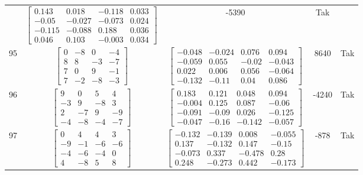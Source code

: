 \documentclass[a4paper,12pt]{article}
\begin{document}
\begin{tabular}{c c c c c}
&
$\begin{bmatrix} 0.143 & 0.018 & -0.118 & 0.033 \\ -0.05 & -0.027 & -0.073 & 0.024 \\ -0.115 & -0.088 & 0.188 & 0.036 \\ 0.046 & 0.103 & -0.003 & 0.034 \end{bmatrix}$
&
-5390
&
Tak
\\
95
&
$\begin{bmatrix} 0 & -8 & 0 & -4 \\ 8 & 8 & -3 & -7 \\ 7 & 0 & 9 & -1 \\ 7 & -2 & -8 & -3 \end{bmatrix}$
&
$\begin{bmatrix} -0.048 & -0.024 & 0.076 & 0.094 \\ -0.059 & 0.055 & -0.02 & -0.043 \\ 0.022 & 0.006 & 0.056 & -0.064 \\ -0.132 & -0.11 & 0.04 & 0.086 \end{bmatrix}$
&
8640
&
Tak
\\
96
&
$\begin{bmatrix} 9 & 0 & 5 & 4 \\ -3 & 9 & -8 & 3 \\ 2 & -7 & 9 & -9 \\ -4 & -8 & -4 & -7 \end{bmatrix}$
&
$\begin{bmatrix} 0.183 & 0.121 & 0.048 & 0.094 \\ -0.004 & 0.125 & 0.087 & -0.06 \\ -0.091 & -0.09 & 0.026 & -0.125 \\ -0.047 & -0.16 & -0.142 & -0.057 \end{bmatrix}$
&
-4240
&
Tak
\\
97
&
$\begin{bmatrix} 0 & 4 & 4 & 3 \\ -9 & -1 & -6 & -6 \\ -4 & -6 & -4 & 0 \\ 4 & -8 & 5 & 8 \end{bmatrix}$
&
$\begin{bmatrix} -0.132 & -0.139 & 0.008 & -0.055 \\ 0.137 & -0.132 & 0.147 & -0.15 \\ -0.073 & 0.337 & -0.478 & 0.28 \\ 0.248 & -0.273 & 0.442 & -0.173 \end{bmatrix}$
&
-878
&
Tak
\\

\end{tabular}
\end{document}
